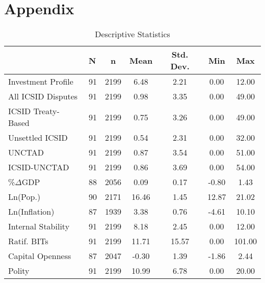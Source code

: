\documentclass[12pt,onesided]{amsart}
\begin{document}
\newpage





\processdelayedfloats 

\newpage

\section*{Appendix}
\label{appendix}

\appendix
\setcounter{figure}{0} \renewcommand{\thefigure}{A.\arabic{figure}}
\setcounter{table}{0} \renewcommand{\thetable}{A.\arabic{table}}

\begin{table}[ht]
\centering
\caption{Descriptive Statistics}
\label{tab:descStats}
\begin{tabular}{llccccc}
	  \hline\hline
	  & N & n & Mean & Std. Dev. & Min & Max \\ 
	  \hline
	Investment Profile & 91 & 2199 & 6.48 & 2.21 & 0.00 & 12.00 \\ 
	  All ICSID Disputes & 91 & 2199 & 0.98 & 3.35 & 0.00 & 49.00 \\ 
	  ICSID Treaty-Based & 91 & 2199 & 0.75 & 3.26 & 0.00 & 49.00 \\ 
	  Unsettled ICSID & 91 & 2199 & 0.54 & 2.31 & 0.00 & 32.00 \\ 
	  UNCTAD & 91 & 2199 & 0.87 & 3.54 & 0.00 & 51.00 \\ 
	  ICSID-UNCTAD & 91 & 2199 & 0.86 & 3.69 & 0.00 & 54.00 \\ 
	  \%$\Delta$GDP & 88 & 2056 & 0.09 & 0.17 & -0.80 & 1.43 \\ 
	  Ln(Pop.) & 90 & 2171 & 16.46 & 1.45 & 12.87 & 21.02 \\ 
	  Ln(Inflation) & 87 & 1939 & 3.38 & 0.76 & -4.61 & 10.10 \\ 
	  Internal Stability & 91 & 2199 & 8.18 & 2.45 & 0.00 & 12.00 \\ 
	  Ratif. BITs & 91 & 2199 & 11.71 & 15.57 & 0.00 & 101.00 \\ 
	  Capital Openness & 87 & 2047 & -0.30 & 1.39 & -1.86 & 2.44 \\ 
	  Polity & 91 & 2199 & 10.99 & 6.78 & 0.00 & 20.00 \\ 
	   \hline\hline
\end{tabular}
\end{table}

\end{document}
